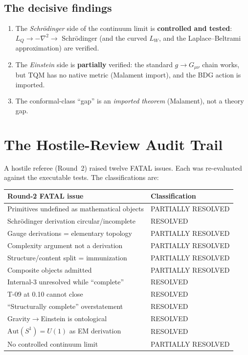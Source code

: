 \documentclass[11pt,twoside]{book}
\begin{document}
\section{The decisive findings}

\begin{enumerate}
\item The \emph{Schr\"odinger} side of the continuum limit is \textbf{controlled and
tested}: $L_Q\to-\nabla^2\to$ Schr\"odinger (and the curved $L_W$, and the
Laplace--Beltrami approximation) are verified.
\item The \emph{Einstein} side is \textbf{partially} verified: the standard $g\to
G_{\mu\nu}$ chain works, but TQM has no native metric (Malament import), and the BDG action
is imported.
\item The conformal-class ``gap'' is an \emph{imported theorem} (Malament), not a theory
gap.
\end{enumerate}


\chapter{The Hostile-Review Audit Trail}
\label{ch:audit-trail}

A hostile referee (Round~2) raised twelve FATAL issues. Each was re-evaluated against the
executable tests. The classifications are:

\begin{center}
\begin{tabular}{p{6.5cm}l}
\toprule
Round-2 FATAL issue & Classification \\
\midrule
Primitives undefined as mathematical objects & PARTIALLY RESOLVED \\
Schr\"odinger derivation circular/incomplete & RESOLVED \\
Gauge derivations = elementary topology & PARTIALLY RESOLVED \\
Complexity argument not a derivation & PARTIALLY RESOLVED \\
Structure/content split = immunization & PARTIALLY RESOLVED \\
Composite objects admitted & PARTIALLY RESOLVED \\
Internal-3 unresolved while ``complete'' & RESOLVED \\
T-09 at 0.10 cannot close & RESOLVED \\
``Structurally complete'' overstatement & RESOLVED \\
Gravity$\to$Einstein is ontological & RESOLVED \\
$\mathrm{Aut}(S^1)=U(1)$ as EM derivation & RESOLVED \\
No controlled continuum limit & PARTIALLY RESOLVED \\
\bottomrule
\end{tabular}
\end{center}
\end{document}
